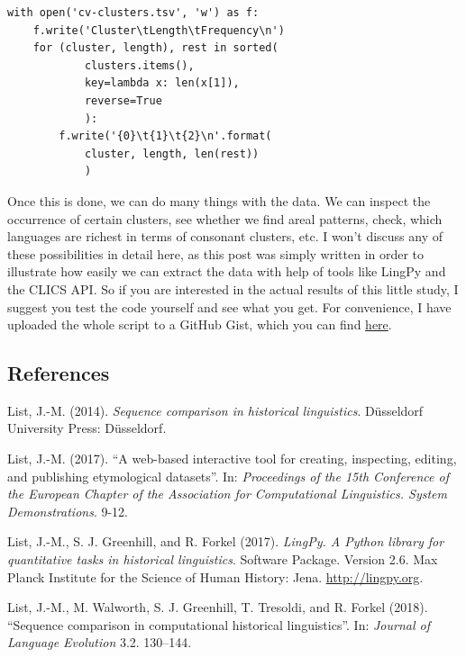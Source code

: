 \documentclass[
  a4paper,
  14pt,
  oneside,
  tablecaptionabove
]{scrbook}
\begin{document}
\begin{lstlisting}
with open('cv-clusters.tsv', 'w') as f:
    f.write('Cluster\tLength\tFrequency\n')
    for (cluster, length), rest in sorted(
            clusters.items(), 
            key=lambda x: len(x[1]),
            reverse=True
            ):
        f.write('{0}\t{1}\t{2}\n'.format(
            cluster, length, len(rest))
            )
\end{lstlisting}

Once this is done, we can do many things with the data. We can inspect
the occurrence of certain clusters, see whether we find areal patterns,
check, which languages are richest in terms of consonant clusters, etc.
I won't discuss any of these possibilities in detail here, as this post
was simply written in order to illustrate how easily we can extract the
data with help of tools like LingPy and the CLICS API. So if you are
interested in the actual results of this little study, I suggest you
test the code yourself and see what you get. For convenience, I have
uploaded the whole script to a GitHub Gist, which you can find
\href{https://gist.github.com/LinguList/1056960125ca79428b420257fa4b02eb}{here}.

\subsection*{References}

\nopagebreak\hangindent=0.7cm {\small List, J.-M. (2014). \emph{Sequence comparison in historical
linguistics}.  Düsseldorf University Press: Düsseldorf. }

\nopagebreak\hangindent=0.7cm {\small List, J.-M. (2017). ``A web-based interactive tool for creating,
inspecting, editing, and publishing etymological datasets''.  In:
\emph{Proceedings of the 15th Conference of the European Chapter of
the Association for Computational Linguistics. System Demonstrations}. 
9-12. }

\nopagebreak\hangindent=0.7cm {\small List, J.-M., S. J. Greenhill, and R. Forkel (2017). \emph{LingPy. A
Python library for quantitative tasks in historical linguistics}. 
Software Package. Version 2.6. Max Planck Institute for the Science of
Human History: Jena. \href{//lingpy.org”}{http://lingpy.org}.  }

\nopagebreak\hangindent=0.7cm {\small List, J.-M., M. Walworth, S. J. Greenhill, T. Tresoldi, and R. Forkel
(2018). ``Sequence comparison in computational historical
linguistics''.  In: \emph{Journal of Language Evolution} 3.2. 130--144. }
\end{document}
